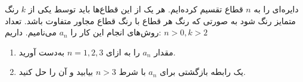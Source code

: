 \EXERCISE
دایره‌ای را به
$n$
قطاع تقسیم کرده‌ایم. هر یک از این قطاع‌ها باید توسط یکی از
$k$
رنگ متمایز رنگ شود به صورتی که رنگ هر قطاع با رنگ قطاع مجاور متفاوت باشد. تعداد روش‌های انجام این کار را
$a_n$
می‌نامیم. داریم: 
$n > 0, k > 2$
\begin{enumerate}
\item
مقدار
$a_n$
را به ازای
$n = 1, 2, 3$
به‌دست آورید.
\item
یک رابطه بازگشتی برای
$a_n$
با شرط
$n > 3$
بیابید و آن را حل کنید.
\end{enumerate}